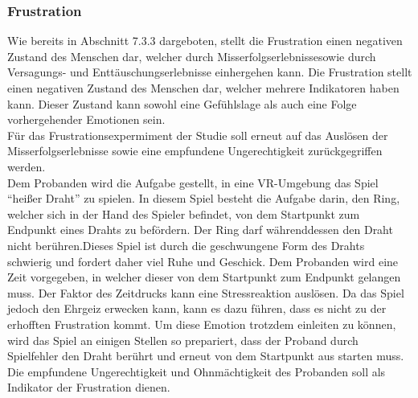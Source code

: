 \subsubsection{Frustration} \label{frust-4}




Wie bereits in Abschnitt 7.3.3 dargeboten, stellt die Frustration einen negativen Zustand des Menschen dar, welcher durch Misserfolgserlebnissesowie durch Versagungs- und Entt{\"a}uschungserlebnisse einhergehen kann. Die Frustration stellt einen negativen Zustand des Menschen dar, welcher mehrere Indikatoren haben kann. Dieser Zustand kann sowohl eine Gef{\"u}hlslage als auch eine Folge vorhergehender Emotionen sein. \\

F{\"u}r das Frustrationsexpermiment der Studie soll erneut auf das Ausl{\"o}sen der Misserfolgserlebnisse sowie eine empfundene Ungerechtigkeit zur{\"u}ckgegriffen werden. \\

Dem Probanden wird die Aufgabe gestellt, in eine VR-Umgebung das Spiel ``hei{\ss}er Draht'' zu spielen. In diesem Spiel besteht die Aufgabe darin, den Ring, welcher sich in der Hand des Spieler befindet, von dem Startpunkt zum Endpunkt eines Drahts zu bef{\"o}rdern. Der Ring darf w{\"a}hrenddessen den Draht nicht ber{\"u}hren.Dieses Spiel ist durch die geschwungene Form des Drahts schwierig und fordert daher viel Ruhe und Geschick. Dem Probanden wird eine Zeit vorgegeben, in welcher dieser von dem Startpunkt zum Endpunkt gelangen muss. Der Faktor des Zeitdrucks kann eine Stressreaktion ausl{\"o}sen. Da das Spiel jedoch den Ehrgeiz erwecken kann, kann es dazu f{\"u}hren, dass es nicht zu der erhofften Frustration kommt. Um diese Emotion trotzdem einleiten zu k{\"o}nnen, wird das Spiel an einigen Stellen so prepariert, dass der Proband durch Spielfehler den Draht ber{\"u}hrt und erneut von dem Startpunkt aus starten muss. Die empfundene Ungerechtigkeit und Ohnm{\"a}chtigkeit des Probanden soll als Indikator der Frustration dienen.
